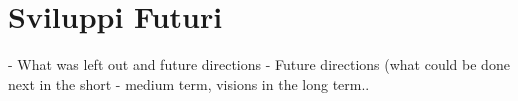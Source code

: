 \section{Sviluppi Futuri} \label{sec:svifut}

- What was left out and future directions
- Future directions (what could be done next in the short - medium term, visions in the long term..